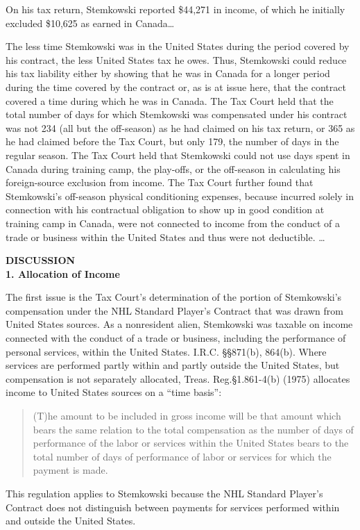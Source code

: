 \begin{select}
On his tax return, Stemkowski reported \$44,271 in income, of which he initially excluded \$10,625 as earned in Canada\ldots

The less time Stemkowski was in the United States during the period covered by his contract, the less United States tax he owes. Thus, Stemkowski could reduce his tax liability either by showing that he was in Canada for a longer period during the time covered by the contract or, as is at issue here, that the contract covered a time during which he was in Canada. The Tax Court held that the total number of days for which Stemkowski was compensated under his contract was not 234 (all but the off-season) as he had claimed on his tax return, or 365 as he had claimed before the Tax Court, but only 179, the number of days in the regular season. The Tax Court held that Stemkowski could not use days spent in Canada during training camp, the play-offs, or the off-season in calculating his foreign-source exclusion from income. The Tax Court further found that Stemkowski's off-season physical conditioning expenses, because incurred solely in connection with his contractual obligation to show up in good condition at training camp in Canada, were not connected to income from the conduct of a trade or business within the United States and thus were not deductible. \ldots

\begin{center} \textbf{DISCUSSION}\\
\textbf{1.  Allocation of Income}
\end{center} 
The first issue is the Tax Court's determination of the portion of Stemkowski's compensation under the NHL Standard Player's Contract that was drawn from United States sources. As a nonresident alien, Stemkowski was taxable on income connected with the conduct of a trade or business, including the performance of personal services, within the United States. I.R.C. \S\S 871(b), 864(b). Where services are performed partly within and partly outside the United States, but compensation is not separately allocated, Treas. Reg.\@ \S 1.861-4(b) (1975) allocates income to United States sources on a ``time basis'':
\begin{quote} 
(T)he amount to be included in gross income will be that amount which bears the same relation to the total compensation as the number of days of performance of the labor or services within the United States bears to the total number of days of performance of labor or services for which the payment is made.
\end{quote} 
This regulation applies to Stemkowski because the NHL Standard Player's Contract does not distinguish between payments for services performed within and outside the United States.


\end{select}
